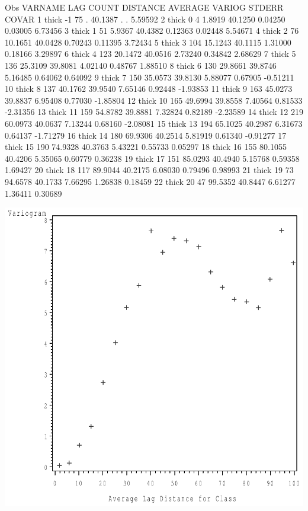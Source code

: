 \documentclass{article}
\begin{document}
\begin{Woutput}
Obs VARNAME LAG COUNT DISTANCE AVERAGE  VARIOG  STDERR   COVAR
  1  thick   -1   75     .     40.1387  .       .       5.59592
  2  thick    0    4    1.8919 40.1250 0.04250 0.03005  6.73456
  3  thick    1   51    5.9367 40.4382 0.12363 0.02448  5.54671
  4  thick    2   76   10.1651 40.0428 0.70243 0.11395  3.72434
  5  thick    3  104   15.1243 40.1115 1.31000 0.18166  3.29897
  6  thick    4  123   20.1472 40.0516 2.73240 0.34842  2.68629
  7  thick    5  136   25.3109 39.8081 4.02140 0.48767  1.88510
  8  thick    6  130   29.8661 39.8746 5.16485 0.64062  0.64092
  9  thick    7  150   35.0573 39.8130 5.88077 0.67905 -0.51211
 10  thick    8  137   40.1762 39.9540 7.65146 0.92448 -1.93853
 11  thick    9  163   45.0273 39.8837 6.95408 0.77030 -1.85804
 12  thick   10  165   49.6994 39.8558 7.40564 0.81533 -2.31356
 13  thick   11  159   54.8782 39.8881 7.32824 0.82189 -2.23589
 14  thick   12  219   60.0973 40.0637 7.13244 0.68160 -2.08081
 15  thick   13  194   65.1025 40.2987 6.31673 0.64137 -1.71279
 16  thick   14  180   69.9306 40.2514 5.81919 0.61340 -0.91277
 17  thick   15  190   74.9328 40.3763 5.43221 0.55733  0.05297
 18  thick   16  155   80.1055 40.4206 5.35065 0.60779  0.36238
 19  thick   17  151   85.0293 40.4940 5.15768 0.59358  1.69427
 20  thick   18  117   89.9044 40.2175 6.08030 0.79496  0.98993
 21  thick   19   73   94.6578 40.1733 7.66295 1.26838  0.18459
 22  thick   20   47   99.5352 40.8447 6.61277 1.36411  0.30689
\end{Woutput}
\includegraphics[]{thick-2-SAS-fig.pdf}
\end{document}
